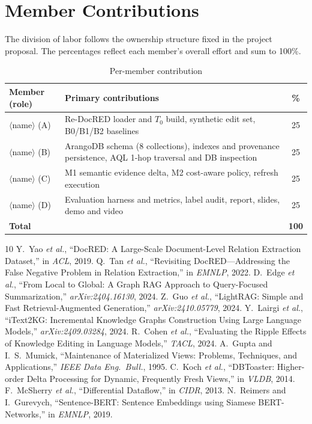 \documentclass[conference]{IEEEtran}
\begin{document}
\section{Member Contributions}
The division of labor follows the ownership structure fixed in the project
proposal. The percentages reflect each member's overall effort and sum to
100\%.
\begin{table}[h]
\caption{Per-member contribution}
\label{tab:contrib}
\centering
\footnotesize
\setlength{\tabcolsep}{4pt}
\begin{tabular}{p{}p{}c}
\toprule
\textbf{Member (role)} & \textbf{Primary contributions} & \textbf{\%}\\
\midrule
$\langle$name$\rangle$ (A) & Re-DocRED loader and $T_0$ build, synthetic edit set, B0/B1/B2 baselines & 25\\
$\langle$name$\rangle$ (B) & ArangoDB schema (8 collections), indexes and provenance persistence, AQL 1-hop traversal and DB inspection & 25\\
$\langle$name$\rangle$ (C) & M1 semantic evidence delta, M2 cost-aware policy, refresh execution & 25\\
$\langle$name$\rangle$ (D) & Evaluation harness and metrics, label audit, report, slides, demo and video & 25\\
\midrule
\textbf{Total} & & \textbf{100}\\
\bottomrule
\end{tabular}
\end{table}

\begin{thebibliography}{10}
\footnotesize
{} Y.~Yao \emph{et al.}, ``DocRED: A Large-Scale Document-Level
Relation Extraction Dataset,'' in \emph{ACL}, 2019.
 Q.~Tan \emph{et al.}, ``Revisiting DocRED---Addressing the
False Negative Problem in Relation Extraction,'' in \emph{EMNLP}, 2022.
 D.~Edge \emph{et al.}, ``From Local to Global: A Graph RAG
Approach to Query-Focused Summarization,'' \emph{arXiv:2404.16130}, 2024.
 Z.~Guo \emph{et al.}, ``LightRAG: Simple and Fast
Retrieval-Augmented Generation,'' \emph{arXiv:2410.05779}, 2024.
 Y.~Lairgi \emph{et al.}, ``iText2KG: Incremental Knowledge
Graphs Construction Using Large Language Models,'' \emph{arXiv:2409.03284}, 2024.
 R.~Cohen \emph{et al.}, ``Evaluating the Ripple Effects of
Knowledge Editing in Language Models,'' \emph{TACL}, 2024.
 A.~Gupta and I.~S.~Mumick, ``Maintenance of Materialized
Views: Problems, Techniques, and Applications,'' \emph{IEEE Data Eng.\ Bull.}, 1995.
 C.~Koch \emph{et al.}, ``DBToaster: Higher-order Delta
Processing for Dynamic, Frequently Fresh Views,'' in \emph{VLDB}, 2014.
 F.~McSherry \emph{et al.}, ``Differential Dataflow,'' in
\emph{CIDR}, 2013.
 N.~Reimers and I.~Gurevych, ``Sentence-BERT: Sentence Embeddings
using Siamese BERT-Networks,'' in \emph{EMNLP}, 2019.
\end{thebibliography}
\end{document}
